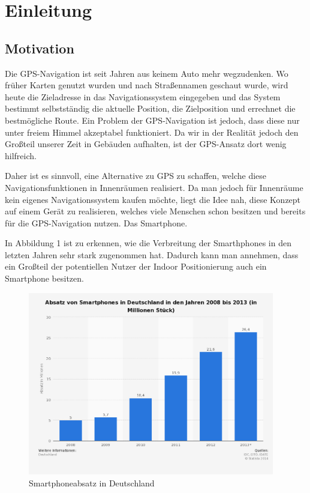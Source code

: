 \chapter{Einleitung}
\label{chap:introduction}

\section{Motivation}
\label{sec:introduction:motivation}

Die GPS-Navigation ist seit Jahren aus keinem Auto mehr wegzudenken. Wo früher Karten genutzt wurden und nach Straßennamen geschaut wurde, wird heute die Zieladresse in das Navigationssystem eingegeben und das System bestimmt selbstständig die aktuelle Position, die Zielposition und errechnet die bestmögliche Route.
Ein Problem der GPS-Navigation ist jedoch, dass diese nur unter freiem Himmel akzeptabel funktioniert.
Da wir in der Realität jedoch den Großteil unserer Zeit in Gebäuden aufhalten, ist der GPS-Ansatz dort wenig hilfreich.

Daher ist es sinnvoll, eine Alternative zu GPS zu schaffen, welche diese Navigationsfunktionen in Innenräumen realisiert.
Da man jedoch für Innenräume kein eigenes Navigationssystem kaufen möchte, liegt die Idee nah, diese Konzept auf einem Gerät zu realisieren, welches viele Menschen schon besitzen und bereits für die GPS-Navigation nutzen. 
Das Smartphone.

In Abbildung 1 ist zu erkennen, wie die Verbreitung der Smarthphones in den letzten Jahren sehr stark zugenommen hat. Dadurch kann man annehmen, dass ein Großteil der potentiellen Nutzer der Indoor Positionierung auch ein Smartphone besitzen.
\begin{figure}[htb]
	\centering
		\includegraphics[height=8cm]{pictures/statistik-smartphonenutzung.png}
		\caption{Smartphoneabsatz in Deutschland}
\end{figure}


